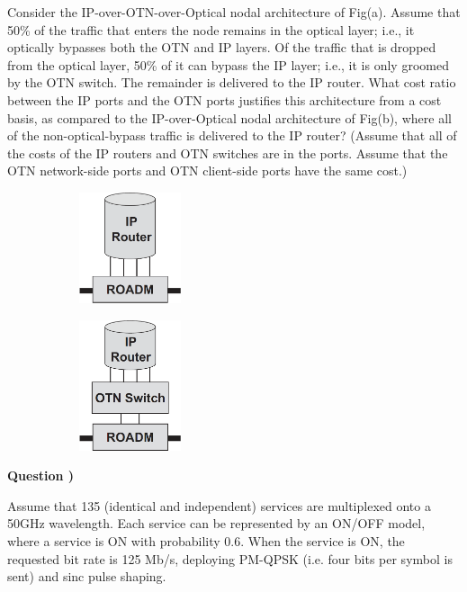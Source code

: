 \documentclass[a4paper]{article}
\newcounter{QuestionNumber}
\newcommand{\Q}{
\textbf{Question \theQuestionNumber)}
\stepcounter{QuestionNumber}
}
\begin{document}
Consider the IP-over-OTN-over-Optical nodal architecture of Fig(a). Assume that 50\% of the traffic that enters the node remains in the optical layer; i.e., it optically bypasses both the OTN and IP layers. Of the traffic that is dropped from the optical layer, 50\% of it can bypass the IP layer; i.e., it is only groomed by the OTN switch. The remainder is delivered to the IP router. What cost ratio between the IP ports and the OTN ports justifies this architecture from a cost basis, as compared to the IP-over-Optical nodal architecture of Fig(b), where all of the non-optical-bypass traffic is delivered to the IP router? (Assume that all of the costs of the IP routers and OTN switches are in the ports. Assume that the OTN network-side ports and OTN client-side ports have the same cost.)

\begin{figure}[h]
\centering
\begin{subfigure}{0.49\textwidth}
\centering
\includegraphics[width=30mm]{IP_router}
\end{subfigure}
\begin{subfigure}{0.49\textwidth}
\centering
\includegraphics[width=30mm]{IP_OTN}
\end{subfigure}
\end{figure}

\Q

Assume that 135 (identical and independent) services are multiplexed onto a 50GHz wavelength. Each service can be represented by an ON/OFF model, where a service is ON with probability 0.6. When the service is ON, the requested bit rate is 125 Mb/s, deploying PM-QPSK (i.e. four bits per symbol is sent) and sinc pulse shaping.
\end{document}

